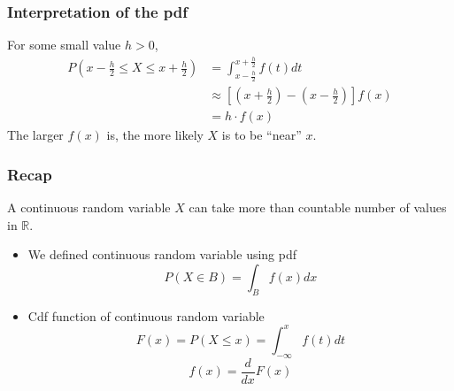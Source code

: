 \documentclass[slidestop,compress,mathserif]{beamer}
\begin{document}
\begin{frame}\frametitle{Interpretation of the pdf}
For some small value $h>0$,
\begin{align*}
P\left(x - \frac{h}{2} \leq X \leq x + \frac{h}{2} \right) & = \int_{x - \frac{h}{2}}^{x + \frac{h}{2}} f(t)dt\\
& \approx \left[ (x + \frac{h}{2}) - (x - \frac{h}{2}) \right] f(x)\\
& = h \cdot f(x)
\end{align*}
The larger $f(x)$ is, the more likely $X$ is to be ``near'' $x$.
\end{frame}


\begin{frame}\frametitle{Recap}

A continuous random variable $X$ can take more than countable number of values in $\mathbb{R}$.
\begin{itemize}
\item We defined continuous random variable using pdf
\[ P(X \in B) = \int_B f(x) dx \]

\item Cdf function of continuous random variable
\[ F(x) = P(X \leq x) =  \int_{-\infty}^{x} f(t) dt \]
\[ f(x) = \frac{d}{dx}F(x) \]
\end{itemize}

\end{frame}


\begin{frame}\frametitle{}

\end{frame}
\end{document}
